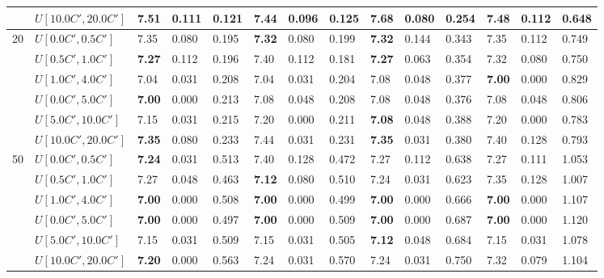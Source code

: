 \begin{table}[h]
{\begin{tabular}{|l|l||l|l|l||l|l|l||l|l|l||l|l|l|}
       & $U[10.0C',20.0C']$ & 7.51 & 0.111 & 0.121 & \textbf{7.44} & 0.096 & 0.125 & 7.68 & 0.080 & 0.254 & 7.48 & 0.112 & 0.648 \\
      \hline\hline
      \multirow{6}{*}{20} & $U[0.0C',0.5C']$ & 7.35 & 0.080 & 0.195 & \textbf{7.32} & 0.080 & 0.199 & \textbf{7.32} & 0.144 & 0.343 & 7.35 & 0.112 & 0.749 \\
       & $U[0.5C',1.0C']$ & \textbf{7.27} & 0.112 & 0.196 & 7.40 & 0.112 & 0.181 & \textbf{7.27} & 0.063 & 0.354 & 7.32 & 0.080 & 0.750 \\
       & $U[1.0C',4.0C']$ & 7.04 & 0.031 & 0.208 & 7.04 & 0.031 & 0.204 & 7.08 & 0.048 & 0.377 & \textbf{7.00} & 0.000 & 0.829 \\
       & $U[0.0C',5.0C']$ & \textbf{7.00} & 0.000 & 0.213 & 7.08 & 0.048 & 0.208 & 7.08 & 0.048 & 0.376 & 7.08 & 0.048 & 0.806 \\
       & $U[5.0C',10.0C']$ & 7.15 & 0.031 & 0.215 & 7.20 & 0.000 & 0.211 & \textbf{7.08} & 0.048 & 0.388 & 7.20 & 0.000 & 0.783 \\
       & $U[10.0C',20.0C']$ & \textbf{7.35} & 0.080 & 0.233 & 7.44 & 0.031 & 0.231 & \textbf{7.35} & 0.031 & 0.380 & 7.40 & 0.128 & 0.793 \\
      \hline\hline
      \multirow{6}{*}{50} & $U[0.0C',0.5C']$ & \textbf{7.24} & 0.031 & 0.513 & 7.40 & 0.128 & 0.472 & 7.27 & 0.112 & 0.638 & 7.27 & 0.111 & 1.053 \\
       & $U[0.5C',1.0C']$ & 7.27 & 0.048 & 0.463 & \textbf{7.12} & 0.080 & 0.510 & 7.24 & 0.031 & 0.623 & 7.35 & 0.128 & 1.007 \\
       & $U[1.0C',4.0C']$ & \textbf{7.00} & 0.000 & 0.508 & \textbf{7.00} & 0.000 & 0.499 & \textbf{7.00} & 0.000 & 0.666 & \textbf{7.00} & 0.000 & 1.107 \\
       & $U[0.0C',5.0C']$ & \textbf{7.00} & 0.000 & 0.497 & \textbf{7.00} & 0.000 & 0.509 & \textbf{7.00} & 0.000 & 0.687 & \textbf{7.00} & 0.000 & 1.120 \\
       & $U[5.0C',10.0C']$ & 7.15 & 0.031 & 0.509 & 7.15 & 0.031 & 0.505 & \textbf{7.12} & 0.048 & 0.684 & 7.15 & 0.031 & 1.078 \\
       & $U[10.0C',20.0C']$ & \textbf{7.20} & 0.000 & 0.563 & 7.24 & 0.031 & 0.570 & 7.24 & 0.031 & 0.750 & 7.32 & 0.079 & 1.104 \\
      \hline
      \end{tabular}
      }
      \label{tab:pcpn90p5}\end{table}


